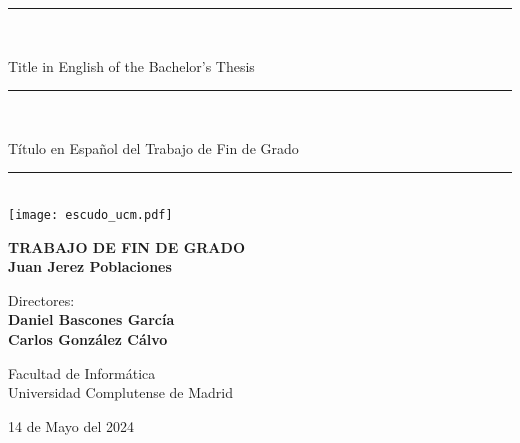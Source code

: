 \begin{titlepage}
	\thispagestyle{empty}

	\begin{center}

		\vspace{1cm}

		\vspace{0.65cm}
		\rule{2in}{0.5pt}\\
		\vspace{0.85cm}

		{\Large Title in English of the Bachelor's Thesis}\\

		\vspace{0.65cm}
		\rule{2in}{0.5pt}\\
		\vspace{0.85cm}

		{\Large Título en Español del Trabajo de Fin de Grado}\\

		\vspace{0.65cm}
		\rule{2in}{0.5pt}\\



		\vfill
		\texttt{[image: escudo\_ucm.pdf]}
		\vfill

		

		\textbf{TRABAJO DE FIN DE GRADO}\\
		\vspace{0.7cm}
		\textbf{Juan Jerez Poblaciones}

		\vspace{1cm}

		Directores:\\
		\textbf{Daniel Bascones García}\\
		\textbf{Carlos González Cálvo}

		\vspace{1.8cm}
		Facultad de Informática\\
		Universidad Complutense de Madrid
		\vspace{0.5cm}
	   
		14 de Mayo del 2024

		\vspace{0.2cm}

	\end{center}
\end{titlepage}